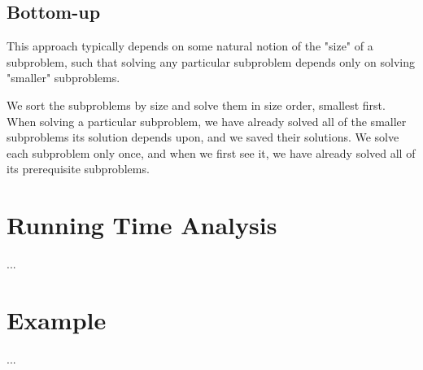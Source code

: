 \subsection{Bottom-up}
This approach typically depends on some natural notion of the "size" of a
subproblem, such that solving any particular subproblem depends only on
solving "smaller" subproblems.

We sort the subproblems by size and solve them in size order, smallest first.
When solving a particular subproblem, we have already solved all of the
smaller subproblems its solution depends upon, and we saved their solutions.
We solve each subproblem only once, and when we first see it, we have already
solved all of its prerequisite subproblems.

\newpage
\section{Running Time Analysis}
...

\section{Example}
...


